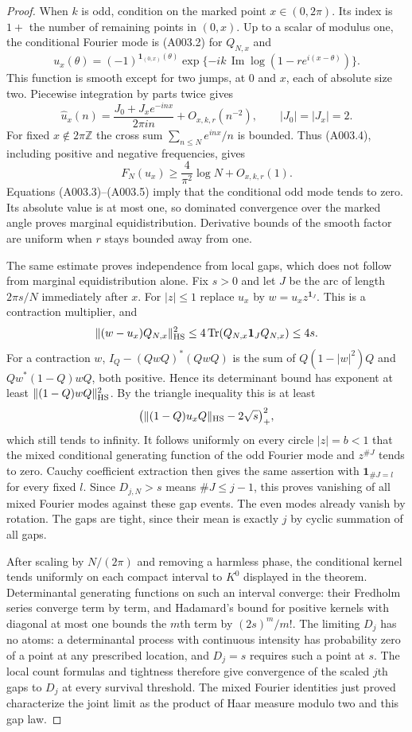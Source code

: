 \begin{proof}
When $k$ is odd, condition on the marked point $x\in(0,2\pi)$.  Its index
is $1+$ the number of remaining points in $(0,x)$.  Up to a scalar of
modulus one, the conditional Fourier mode is (A003.2) for $Q_{N,x}$ and
\[
 u_x(\theta)=(-1)^{\mathbf1_{(0,x)}(\theta)}
        \exp\{-ik\,\operatorname{Im}\log(1-r e^{i(x-\theta)})\}.
\]
This function is smooth except for two jumps, at $0$ and $x$, each of
absolute size two.  Piecewise integration by parts twice gives
\[
 \widehat u_x(n)=\frac{J_0+J_x e^{-inx}}{2\pi i n}+O_{x,k,r}(n^{-2}),
 \qquad |J_0|=|J_x|=2.
\]
For fixed $x\notin2\pi\mathbb Z$ the cross sum
$\sum_{n\leq N}e^{inx}/n$ is bounded.  Thus (A003.4), including positive
and negative frequencies, gives
\[
 F_N(u_x)\geq\frac4{\pi^2}\log N+O_{x,k,r}(1).
\]
Equations (A003.3)--(A003.5) imply that the conditional odd mode tends to
zero.  Its absolute value is at most one, so dominated convergence over
the marked angle proves marginal equidistribution.  Derivative bounds of
the smooth factor are uniform when $r$ stays bounded away from one.

The same estimate proves independence from local gaps, which does not
follow from marginal equidistribution alone.  Fix $s>0$ and let $J$ be the
arc of length $2\pi s/N$ immediately after $x$.  For $|z|\leq1$ replace
$u_x$ by $w=u_x z^{\mathbf1_J}$.  This is a contraction multiplier, and
\[
 \|(w-u_x)Q_{N,x}\|_{\rm HS}^2
      \leq 4\operatorname{Tr}(Q_{N,x}\mathbf1_JQ_{N,x})\leq4s.
\]
For a contraction $w$, $I_Q-(QwQ)^*(QwQ)$ is the sum of
$Q(1-|w|^2)Q$ and $Qw^*(1-Q)wQ$, both positive.  Hence its determinant
bound has exponent at least $\|(1-Q)wQ\|_{\rm HS}^2$.  By the triangle
inequality this is at least
\[
 \bigl(\|(1-Q)u_xQ\|_{\rm HS}-2\sqrt s\bigr)_+^2,
\]
which still tends to infinity.  It follows uniformly on every circle
$|z|=b<1$ that the mixed conditional generating function of the odd
Fourier mode and $z^{\#J}$ tends to zero.  Cauchy coefficient extraction
then gives the same assertion with $\mathbf1_{\#J=l}$ for every fixed
$l$.  Since $D_{j,N}>s$ means $\#J\leq j-1$, this proves vanishing of
all mixed Fourier modes against these gap events.  The even modes already
vanish by rotation.  The gaps are tight, since their mean is exactly $j$
by cyclic summation of all gaps.

After scaling by $N/(2\pi)$ and removing a harmless phase, the conditional
kernel tends uniformly on each compact interval to $K^0$ displayed in the
theorem.  Determinantal generating functions on such an interval converge:
their Fredholm series converge term by term, and Hadamard's bound for
positive kernels with diagonal at most one bounds the $m$th term by
$ (2s)^m/m!$. The limiting $D_j$ has no atoms: a determinantal process
with continuous intensity has probability zero of a point at any
prescribed location, and $D_j=s$ requires such a point at $s$.
The local count formulas and tightness therefore give convergence of
the scaled $j$th gaps to $D_j$ at every survival threshold. The mixed Fourier
identities just proved characterize the joint limit as the product of
Haar measure modulo two and this gap law.


\end{proof}
